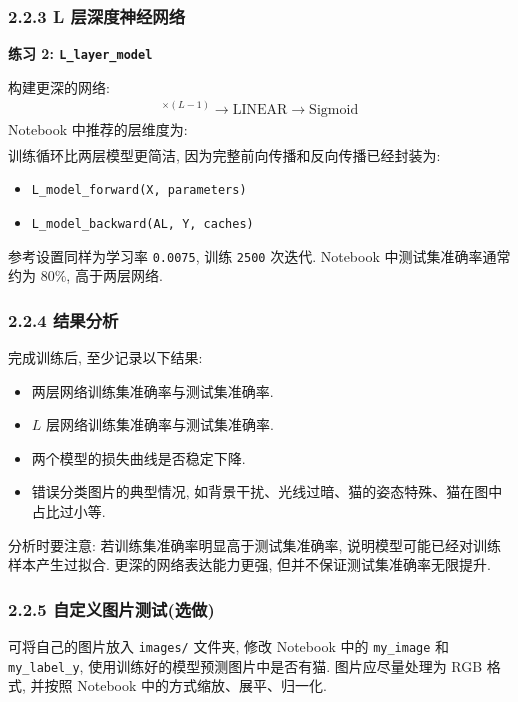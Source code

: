 \documentclass{../../nndlcourse}
\begin{document}
\subsubsection*{2.2.3 L 层深度神经网络}

\textbf{练习 2: \texttt{L\_layer\_model}}

构建更深的网络:
\begin{align}
    [\mathrm{LINEAR}\to\mathrm{ReLU}]^{\times(L-1)}
    \to \mathrm{LINEAR}\to\mathrm{Sigmoid}
\end{align}
Notebook 中推荐的层维度为:
\begin{align}
    [12288, 20, 7, 5, 1]
\end{align}
训练循环比两层模型更简洁, 因为完整前向传播和反向传播已经封装为:
\begin{itemize}
    \item \texttt{L\_model\_forward(X, parameters)}
    \item \texttt{L\_model\_backward(AL, Y, caches)}
\end{itemize}
参考设置同样为学习率 \texttt{0.0075}, 训练 \texttt{2500} 次迭代. Notebook 中测试集准确率通常约为 $80\%$, 高于两层网络.

\subsubsection*{2.2.4 结果分析}

完成训练后, 至少记录以下结果:
\begin{itemize}
    \item 两层网络训练集准确率与测试集准确率.
    \item $L$ 层网络训练集准确率与测试集准确率.
    \item 两个模型的损失曲线是否稳定下降.
    \item 错误分类图片的典型情况, 如背景干扰、光线过暗、猫的姿态特殊、猫在图中占比过小等.
\end{itemize}

分析时要注意: 若训练集准确率明显高于测试集准确率, 说明模型可能已经对训练样本产生过拟合. 更深的网络表达能力更强, 但并不保证测试集准确率无限提升.

\subsubsection*{2.2.5 自定义图片测试(选做)}

可将自己的图片放入 \texttt{images/} 文件夹, 修改 Notebook 中的 \texttt{my\_image} 和 \texttt{my\_label\_y}, 使用训练好的模型预测图片中是否有猫. 图片应尽量处理为 RGB 格式, 并按照 Notebook 中的方式缩放、展平、归一化.
\end{document}
